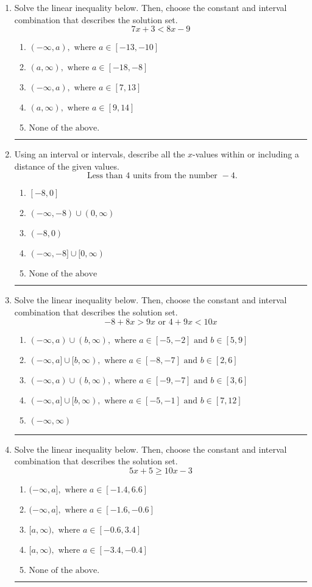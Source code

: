 \documentclass[14pt]{extbook}
\newcommand{\litem}[1]{\item#1\hspace*{-1cm}\rule{\textwidth}{0.4pt}}
\begin{document}
\begin{enumerate}
\litem{
Solve the linear inequality below. Then, choose the constant and interval combination that describes the solution set.\[ 7x + 3 < 8x -9 \]\begin{enumerate}[label=\Alph*.]
\item \( (-\infty, a), \text{ where } a \in [-13, -10] \)
\item \( (a, \infty), \text{ where } a \in [-18, -8] \)
\item \( (-\infty, a), \text{ where } a \in [7, 13] \)
\item \( (a, \infty), \text{ where } a \in [9, 14] \)
\item \( \text{None of the above}. \)

\end{enumerate} }
\litem{
Using an interval or intervals, describe all the $x$-values within or including a distance of the given values.\[ \text{ Less than } 4 \text{ units from the number } -4. \]\begin{enumerate}[label=\Alph*.]
\item \( [-8, 0] \)
\item \( (-\infty, -8) \cup (0, \infty) \)
\item \( (-8, 0) \)
\item \( (-\infty, -8] \cup [0, \infty) \)
\item \( \text{None of the above} \)

\end{enumerate} }
\litem{
Solve the linear inequality below. Then, choose the constant and interval combination that describes the solution set.\[ -8 + 8 x > 9 x \text{ or } 4 + 9 x < 10 x \]\begin{enumerate}[label=\Alph*.]
\item \( (-\infty, a) \cup (b, \infty), \text{ where } a \in [-5, -2] \text{ and } b \in [5, 9] \)
\item \( (-\infty, a] \cup [b, \infty), \text{ where } a \in [-8, -7] \text{ and } b \in [2, 6] \)
\item \( (-\infty, a) \cup (b, \infty), \text{ where } a \in [-9, -7] \text{ and } b \in [3, 6] \)
\item \( (-\infty, a] \cup [b, \infty), \text{ where } a \in [-5, -1] \text{ and } b \in [7, 12] \)
\item \( (-\infty, \infty) \)

\end{enumerate} }
\litem{
Solve the linear inequality below. Then, choose the constant and interval combination that describes the solution set.\[ 5x + 5 \geq 10x -3 \]\begin{enumerate}[label=\Alph*.]
\item \( (-\infty, a], \text{ where } a \in [-1.4, 6.6] \)
\item \( (-\infty, a], \text{ where } a \in [-1.6, -0.6] \)
\item \( [a, \infty), \text{ where } a \in [-0.6, 3.4] \)
\item \( [a, \infty), \text{ where } a \in [-3.4, -0.4] \)
\item \( \text{None of the above}. \)


\end{enumerate}}
\end{enumerate}
\end{document}
